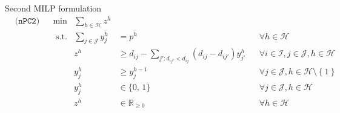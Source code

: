 \documentclass[utf8,aspectratio=169,ngerman,english]{beamer}
\newcommand{\nPCY}{\hyperref[eq:nPCY]{\texttt{(nPC2)}}}
\begin{document}
\begin{frame}{Second MILP formulation}
    \vspace{-15pt}
    \begin{subequations}\label{eq:nPCY}
        \begin{align}
             & \nPCY &  & \min         & \sum_{h \in \mathcal H}    z^{h}   &                                                                      &  & \label{eq:pc2N-obj}                                                                             \\
             &       &  & \text{ s.t.} & \sum_{j \in \mathcal J}    y_{j}^h & =     p^h                                                            &  & \forall h \in \mathcal H                                                 \label{eq:pc2N-numfac} \\
             &       &  &              & z^{h}                              & \geq  d_{ij} - \sum_{j':d_{ij'} < d_{ij}} (d_{ij} - d_{ij'})y_{j'}^h &  & \forall i \in \mathcal I, j \in \mathcal J, h \in \mathcal H             \label{eq:pc2N-zpush}  \\
             &       &  &              & y_j^{h}                            & \geq  y_j^{h-1}                                                      &  & \forall j \in \mathcal J, h \in \mathcal H \setminus \left \{1 \right \} \label{eq:pc2N-nested} \\
             &       &  &              & y_{j}^h                            & \in   \{\text{0, 1}\}                                                &  & \forall j \in \mathcal J, h \in \mathcal H                               \label{eq:pc2N-bin}    \\
             &       &  &              & z^{h}                              & \in   \mathbb R_{\ge 0}                                              &  & \forall h \in \mathcal H                                                 \label{eq:pc2N-real}
        \end{align}
    \end{subequations}
\end{frame}
\end{document}
